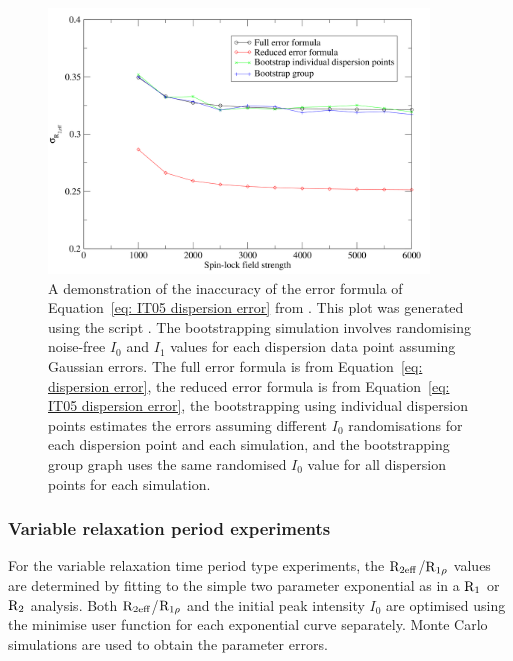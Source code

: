\begin{figure}[h]
\centerline{\includegraphics[width=0.9\textwidth, bb=14 14 728 512]{graphics/analyses/dispersion/error_comparison}}
\caption[Comparison of relaxation dispersion errors]{A demonstration of the inaccuracy of the error formula of Equation~\ref{eq: IT05 dispersion error} from \citet{IshimaTorchia05}.  This plot was generated using the script .  The bootstrapping simulation involves randomising noise-free $I_0$ and $I_1$ values for each dispersion data point assuming Gaussian errors.  The full error formula is from Equation~\ref{eq: dispersion error}, the reduced error formula is from Equation~\ref{eq: IT05 dispersion error}, the bootstrapping using individual dispersion points estimates the errors assuming different $I_0$ randomisations for each dispersion point and each simulation, and the bootstrapping group graph uses the same randomised $I_0$ value for all dispersion points for each simulation.}
\label{fig: dispersion error comparison}
\end{figure}


\subsubsection{Variable relaxation period experiments}

For the variable relaxation time period type experiments, the $\mathrm{R}_\textrm{2eff}$/$\mathrm{R}_{1\rho}$ values are determined by fitting to the simple two parameter exponential as in a $\mathrm{R}_1$ or $\mathrm{R}_2$ analysis.
Both $\mathrm{R}_\textrm{2eff}$/$\mathrm{R}_{1\rho}$ and the initial peak intensity $I_0$ are optimised using the minimise user function for each exponential curve separately.
Monte Carlo simulations are used to obtain the parameter errors.



